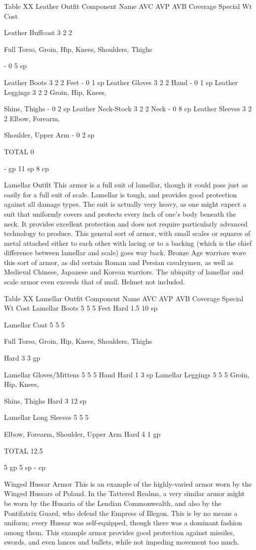 \documentclass[oneside,11pt,english]{book}
\begin{document}
Table XX Leather Outfit
Component Name AVC AVP AVB Coverage Special Wt Cost

Leather Buffcoat 3 2 2

Full Torso, Groin, Hip, 
Knees, Shoulders, 
Thighs

- 0 5 sp

Leather Boots 3 2 2 Feet - 0 1 sp
Leather Gloves 3 2 2 Hand - 0 1 sp
Leather Leggings 3 2 2 Groin, Hip, Knees, 

Shins, Thighs - 0 2 sp
Leather Neck-Stock 3 2 2 Neck - 0 8 cp
Leather Sleeves 3 2 2 Elbow, Forearm, 

Shoulder, Upper Arm - 0 2 sp


TOTAL 0

- gp
11 sp
8 cp

Lamellar Outfit
This armor is a full suit of lamellar, though it could pass just as easily for a full suit of scale. Lamellar is tough, and 
provides good protection against all damage types. The suit is actually very heavy, as one might expect a suit that 
uniformly covers and protects every inch of one's body beneath the neck. It provides excellent protection and does not
require particularly advanced technology to produce. This general sort of armor, with small scales or squares of metal 
attached either to each other with lacing or to a backing (which is the chief difference between lamellar and scale) 
goes way back. Bronze Age warriors wore this sort of armor, as did certain Roman and Persian cavalrymen, as well as
Medieval Chinese, Japanese and Korean warriors. The ubiquity of lamellar and scale armor even exceeds that of mail. 
Helmet not included.

Table XX Lamellar Outfit
Component Name AVC AVP AVB Coverage Special Wt Cost
Lamellar Boots 5 5 5 Feet Hard 1.5 10 sp

Lamellar Coat 5 5 5

Full Torso, Groin, Hip, 
Knees, Shoulders, 
Thighs 

Hard 3 3 gp

Lamellar 
Gloves/Mittens 5 5 5 Hand Hard 1 3 sp
Lamellar Leggings 5 5 5 Groin, Hip, Knees, 

Shins, Thighs Hard 3 12 sp

Lamellar Long 
Sleeves 5 5 5

Elbow, Forearm, 
Shoulder, Upper Arm Hard 4 1 gp

TOTAL 12.5

5 gp
5 sp
- cp

Winged Hussar Armor
This is an example of the highly-varied armor worn by the Winged Hussars of Poland. In the Tattered Realms, a very 
similar armor might be worn by the Husaria of the Lendian Commonwealth, and also by the Pontifatrix Guard, who 
defend the Empress of Illegon. This is by no means a uniform; every Hussar was self-equipped, though there was a 
dominant fashion among them. This example armor provides good protection against missiles, swords, and even 
lances and bullets, while not impeding movement too much.
\end{document}
